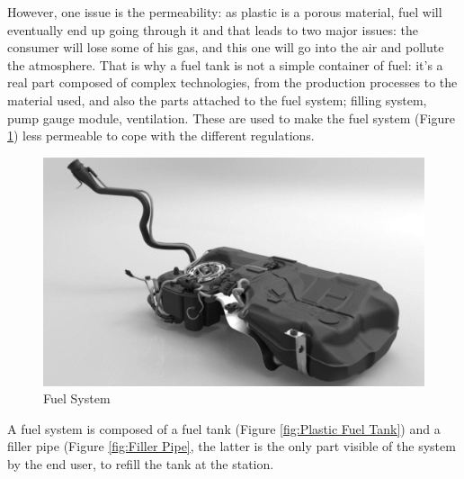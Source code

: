 However, one issue is the permeability: as plastic is a porous material, fuel will eventually end up going through it and that leads to two major issues: the consumer will lose some of his gas, and this one will go into the air and pollute the atmosphere. That is why a fuel tank is not a simple container of fuel: it’s a real part composed of complex technologies, from the production processes to the material used, and also the parts attached to the fuel system; filling system, pump gauge module, ventilation. These are used to make the fuel system (Figure \ref{fig:Fuel System}) less permeable to cope with the different regulations.
\begin{figure}
\centerline{\includegraphics[scale=0.4]{images/appendix_A/fuel_system.png}}
\caption{Fuel System}
\label{fig:Fuel System}
\end{figure}
A fuel system is composed of a fuel tank (Figure \ref{fig:Plastic Fuel Tank}) and a filler pipe (Figure \ref{fig:Filler Pipe}, the latter is the only part visible of the system by the end user, to refill the tank at the station.

